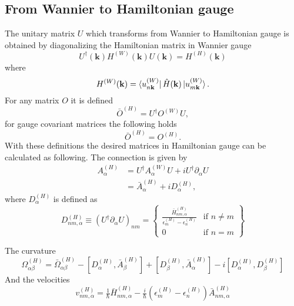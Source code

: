 \documentclass{scrreprt}
\begin{document}
\subsection{From Wannier to Hamiltonian gauge}
The unitary matrix $U$ which transforms from Wannier to Hamiltonian gauge is obtained by diagonalizing the Hamiltonian matrix in Wannier gauge
\begin{equation}
  U^\dagger (\mathbf{k}) H^{(W)} (\mathbf{k})  U (\mathbf{k}) = H^{(H)} (\mathbf{k})
\end{equation}
where
\begin{equation}
  H^{(W)} (\mathbf{k})  = \bra{ u^{(W)}_{ n\mathbf{k} } } \hat{H}(\mathbf{k}) \ket{ u^{(W)}_{ m\mathbf{k} }  }.
\end{equation}
For any matrix $O$ it is defined
\begin{equation}
  \bar{O}^{(H)} = U^\dagger O^{(W)} U,
\end{equation}
for gauge covariant matrices the following holds \cite{wang2006}
\begin{equation}
    \bar{O}^{(H)} = O^{(H)}.
\end{equation}
With these definitions the desired matrices in Hamiltonian gauge can be calculated as following.
The connection is given by
\begin{align}
A^{(H)}_\alpha &= U^\dagger A^{(W)}_\alpha U + i U^\dagger \partial_\alpha U  \nonumber \\
            &= \bar{A}^{(H)}_\alpha + i D^{(H)}_\alpha,
\end{align}
where $D^{(H)}_\alpha$ is defined as
\begin{equation}
  D^{(H)}_{nm,\alpha} \equiv (U^\dagger  \partial_\alpha U)_{nm} = \begin{Bmatrix}
 \tfrac{\bar{H}^{(H)}_{nm,\alpha} }{\epsilon^{(H)}_m -\epsilon^{(H)}_n } & \text{if } n \neq m\\
 0 & \text{if } n = m
\end{Bmatrix}
\end{equation}

The curvature
\begin{equation}
  \Omega^{(H)}_{\alpha \beta} = \bar{\Omega}^{(H)}_{\alpha \beta} - [D^{(H)}_\alpha,\bar{A}^{(H)}_\beta] + [D^{(H)}_\beta, \bar{A}^{(H)}_\alpha ] -i [D^{(H)}_\alpha , D^{(H)}_\beta]
\end{equation}
And the velocities
\begin{equation}
  v^{(H)}_{nm, \alpha} = \tfrac{1}{\hbar} \bar{H}^{(H)}_{nm, \alpha} - \tfrac{i}{\hbar} (\epsilon^{(H)}_m -\epsilon^{(H)}_n) \bar{A}^{(H)}_{nm, \alpha}
\end{equation}
\end{document}
